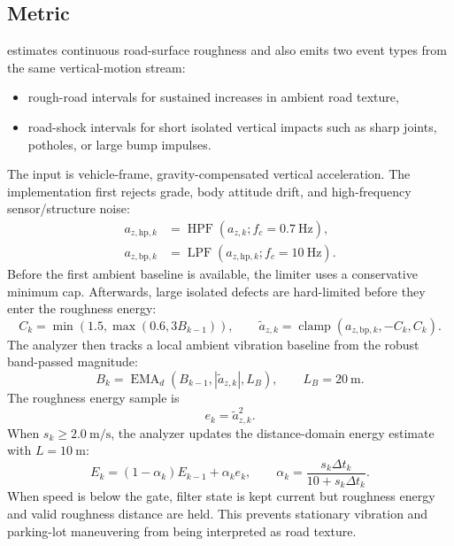 \documentclass[11pt]{article}
\newcommand{\abs}[1]{\left|#1\right|}
\begin{document}
\subsection{Metric}

 estimates continuous road-surface roughness and
also emits two event types from the same vertical-motion stream:
\begin{itemize}[nosep]
  \item rough-road intervals for sustained increases in ambient road texture,
  \item road-shock intervals for short isolated vertical impacts such as sharp
    joints, potholes, or large bump impulses.
\end{itemize}

The input is vehicle-frame, gravity-compensated vertical acceleration. The
implementation first rejects grade, body attitude drift, and high-frequency
sensor/structure noise:
\begin{align}
  a_{z,\mathrm{hp},k} &=
    \operatorname{HPF}(a_{z,k}; f_c=0.7~\mathrm{Hz}),\\
  a_{z,\mathrm{bp},k} &=
    \operatorname{LPF}(a_{z,\mathrm{hp},k}; f_c=10~\mathrm{Hz}).
\end{align}
Before the first ambient baseline is available, the limiter uses a conservative
minimum cap. Afterwards, large isolated defects are hard-limited before they
enter the roughness energy:
\begin{equation}
  C_k = \min\left(1.5,\max(0.6,3B_{k-1})\right),
  \qquad
  \tilde{a}_{z,k}
  = \operatorname{clamp}(a_{z,\mathrm{bp},k}, -C_k, C_k).
\end{equation}
The analyzer then tracks a local ambient vibration baseline from the robust
band-passed magnitude:
\begin{equation}
  B_k = \operatorname{EMA}_{d}(B_{k-1}, \abs{\tilde{a}_{z,k}}, L_B),
  \qquad L_B=20~\mathrm{m}.
\end{equation}
The roughness energy sample is
\begin{equation}
  e_k = \tilde{a}_{z,k}^2 .
\end{equation}
When \(s_k\ge2.0~\mathrm{m/s}\), the analyzer updates the distance-domain
energy estimate with \(L=10~\mathrm{m}\):
\begin{equation}
  E_k = (1-\alpha_k)E_{k-1}+\alpha_k e_k,
  \qquad
  \alpha_k=\frac{s_k\Delta t_k}{10+s_k\Delta t_k}.
\end{equation}
When speed is below the gate, filter state is kept current but roughness energy
and valid roughness distance are held. This prevents stationary vibration and
parking-lot maneuvering from being interpreted as road texture.
\end{document}
